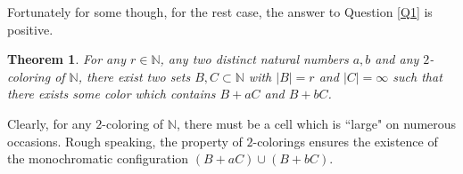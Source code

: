 \documentclass[reqno,12pt]{amsart}
\newtheorem{thm}{Theorem}[section]
\newtheorem{prop}[thm]{Proposition}
\newtheorem{rem}[thm]{Remark}
\def \N {\mathbb N}
\def \Z {\mathbb Z}
\numberwithin{equation}{section}
\begin{document}
Fortunately for some though, for the rest case, the answer to Question \ref{Q1} is positive.
\begin{thm}\label{T1}
	For any $r\in \N$, any two distinct natural numbers $a,b$ and any $2$-coloring of $\N$, there exist two sets $B,C\subset \N$ with $|B|=r$ and $|C|=\infty$ such that there exists some color which contains $B+aC$ and $B+bC$.
\end{thm}
Clearly, for any $2$-coloring of $\N$, there must be a cell which is ``large" on numerous occasions. Rough speaking, the property of $2$-colorings ensures the existence of the monochromatic configuration 
$(B+aC)\cup (B+bC)$.
\end{document}
